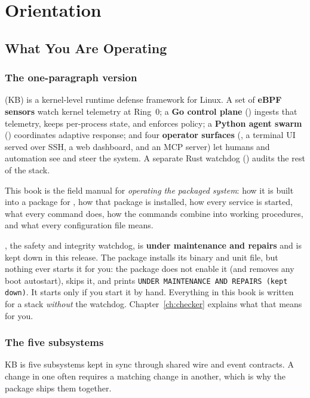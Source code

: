 \part{Orientation}
\chapter{What You Are Operating}
\section{The one-paragraph version}
\kb{} (KB) is a kernel-level runtime defense framework for Linux. A set of \textbf{eBPF sensors} watch kernel
telemetry at Ring~0; a \textbf{Go control plane} () ingests that telemetry, keeps per-process state,
and enforces policy; a \textbf{Python agent swarm} () coordinates adaptive response; and four
\textbf{operator surfaces} (, a terminal UI served over SSH, a web dashboard, and an MCP server)
let humans and automation see and steer the system. A separate Rust watchdog () audits the
rest of the stack.

This book is the field manual for \emph{operating the packaged system}: how it is built into a
\pkgext{} package for \distroname, how that package is installed, how every service is started, what every
command does, how the commands combine into working procedures, and what every configuration file means.

\begin{kbwarn}
, the safety and integrity watchdog, is \textbf{under maintenance and repairs} and is kept
down in this release. The package installs its binary and unit file, but nothing ever starts it for you:
the package does not enable it (and removes any boot autostart),  skips it, and 
prints \texttt{UNDER MAINTENANCE AND REPAIRS (kept down)}. It starts only if you start it by hand. Everything in this book is written for a stack
\emph{without} the watchdog. Chapter~\ref{ch:checker} explains what that means for you.
\end{kbwarn}

\section{The five subsystems}
KB is five subsystems kept in sync through shared wire and event contracts. A change in one often
requires a matching change in another, which is why the package ships them together.

